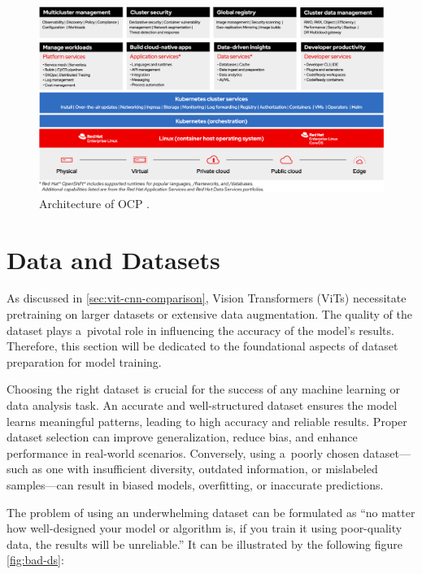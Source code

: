 \begin{figure}[htbp]
    \centering
    \includegraphics[width=\linewidth]{obrazky-figures/02-theoretical-basis/ocp.png}
    \caption{Architecture of OCP \cite{RedHat2023}.}
    \label{fig:ocp-arch}
\end{figure}

\chapter{Data and Datasets}
\label{chapter:dataanddataset}

As discussed in \autoref{sec:vit-cnn-comparison}, Vision Transformers (ViTs) necessitate pretraining on larger datasets or extensive data augmentation. The quality of the dataset plays a~pivotal role in influencing the accuracy of the model's results. Therefore, this section will be dedicated to the foundational aspects of dataset preparation for model training.

\medskip

Choosing the right dataset is crucial for the success of any machine learning or data analysis task. An accurate and well-structured dataset ensures the model learns meaningful patterns, leading to high accuracy and reliable results. Proper dataset selection can improve generalization, reduce bias, and enhance performance in real-world scenarios. Conversely, using a~poorly chosen dataset—such as one with insufficient diversity, outdated information, or mislabeled samples—can result in biased models, overfitting, or inaccurate predictions.

The problem of using an underwhelming dataset can be formulated as \enquote{no matter how well-designed your model or algorithm is, if you train it using poor-quality data, the results will be unreliable.} It can be illustrated by the following figure \autoref{fig:bad-ds}:

